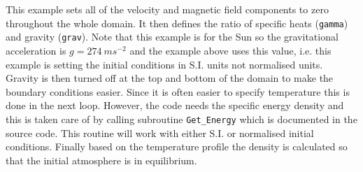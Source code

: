 \documentclass[11pt]{article}
\begin{document}
This example sets all of the velocity and magnetic field components to zero throughout the whole domain. It then defines the ratio of specific heats (\texttt{gamma}) and gravity (\texttt{grav}). Note that this example is for the Sun so the gravitational acceleration is $g = 274\ ms^{-2}$ and the example above uses this value, i.e. this example is setting the initial conditions in S.I. units not normalised units. Gravity is then turned off at the top and bottom of the domain to make the boundary conditions easier. Since it is often easier to specify temperature this is done in the next loop. However, the code needs the specific energy density and this is taken care of by calling subroutine \texttt{Get\_Energy} which is documented in the source code. This routine will work with either S.I. or normalised initial conditions. Finally based on the temperature profile the density is calculated so that the initial atmosphere is in equilibrium.  
\end{document}
